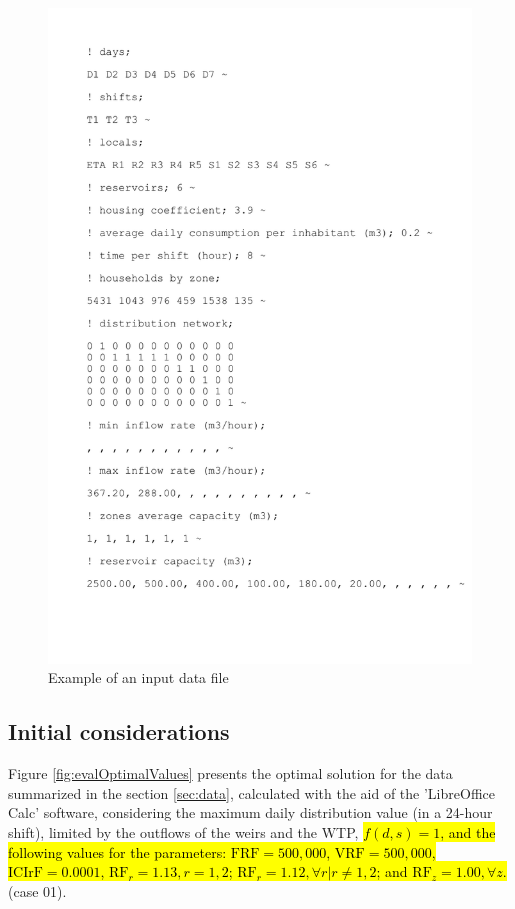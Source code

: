 \documentclass{singlecol}
\theoremstyle{TH}{
\newtheorem{lemma}{Lemma}
\newtheorem{theorem}[lemma]{Theorem}
\newtheorem{corrolary}[lemma]{Corrolary}
\newtheorem{conjecture}[lemma]{Conjecture}
\newtheorem{proposition}[lemma]{Proposition}
\newtheorem{claim}[lemma]{Claim}
\newtheorem{stheorem}[lemma]{Wrong Theorem}
\newtheorem{algorithm}{Algorithm}
}
\theoremstyle{THrm}{
\newtheorem{definition}{Definition}[section]
\newtheorem{question}{Question}[section]
\newtheorem{remark}{Remark}
\newtheorem{scheme}{Scheme}
}
\theoremstyle{THhit}{
\newtheorem{case}{Case}[section]
}
\begin{document}
\begin{figure}[h!]
\centering
\includegraphics[scale=0.8, frame]{data.pdf}
\caption{Example of an input data file}
\label{fig:inputData}
\end{figure}

\subsection{Initial considerations}
\label{sec:initialConsiderations}

Figure \ref{fig:evalOptimalValues} presents the optimal solution for the data summarized in the section \ref{sec:data}, calculated with the aid of the 'LibreOffice Calc' software, considering the maximum daily distribution value (in a 24-hour shift), limited by the outflows of the weirs and the WTP,  \hl{$f(d,s)=1$, and the following values for the parameters: $\mathrm{FRF}= 500,000$, $\mathrm{VRF}= 500,000$,  $\mathrm{ICIrF} = 0.0001$,  $\mathrm{RF}_r = 1.13, r=1,2$;  $\mathrm{RF}_r = 1.12,  \forall r | r \neq 1,2$; and $\mathrm{RF}_z =1.00, \forall z$.} (case 01). 
\end{document}
